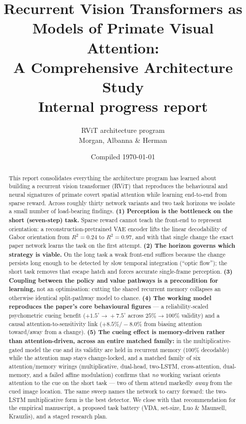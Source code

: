 \documentclass[11pt]{report}
\title{\bfseries Recurrent Vision Transformers as Models of Primate Visual
Attention:\\[4pt] A Comprehensive Architecture Study\\[10pt]
\large Internal progress report}
\author{RViT architecture program\\\small Morgan, Albanna \& Herman}
\date{Compiled \today}
\newcommand{\Rsq}{R^{2}}
\begin{document}
\maketitle

\begin{abstract}
\noindent
This report consolidates everything the architecture program has learned about
building a recurrent vision transformer (RViT) that reproduces the behavioural and
neural signatures of primate covert spatial attention while learning end-to-end from
sparse reward. Across roughly thirty network variants and two task horizons we isolate
a small number of load-bearing findings. \textbf{(1) Perception is the bottleneck on the
short (seven-step) task.} Sparse reward cannot teach the front-end to represent
orientation: a reconstruction-pretrained VAE encoder lifts the linear decodability of
Gabor orientation from $\Rsq=0.24$ to $\Rsq=0.97$, and with that single change the exact
paper network learns the task on the first attempt. \textbf{(2) The horizon governs which
strategy is viable.} On the long task a weak front-end suffices because the change
persists long enough to be detected by slow temporal integration (``optic flow''); the
short task removes that escape hatch and forces accurate single-frame perception.
\textbf{(3) Coupling between the policy and value pathways is a precondition for
learning,} not an optimisation: cutting the shared recurrent memory collapses an
otherwise identical split-pathway model to chance. \textbf{(4) The working model reproduces
the paper's core behavioural figures} --- a reliability-scaled psychometric cueing benefit
($+1.5^\circ\!\to\!+7.5^\circ$ across $25\%\!\to\!100\%$ validity) and a causal
attention-to-sensitivity link ($+8.5\%/-8.0\%$ from biasing attention toward/away from a
change). \textbf{(5) The cueing effect is memory-driven rather than attention-driven, across an
entire matched family:} in the multiplicative-gated model the cue and its validity are held
in recurrent memory ($100\%$ decodable) while the attention map stays change-locked, and a
matched family of six attention/memory wirings (multiplicative, dual-head, two-LSTM,
cross-attention, dual-memory, and a failed affine modulation) confirms that \emph{no} working
variant orients attention to the cue on the short task --- two of them attend markedly
\emph{away} from the cued image location. The same sweep names the network to carry forward:
the two-LSTM multiplicative form is the best detector. We close with that recommendation for
the empirical manuscript, a proposed task battery (VDA, set-size, Luo \& Maunsell, Krauzlis),
and a staged research plan.
\end{abstract}
\end{document}
